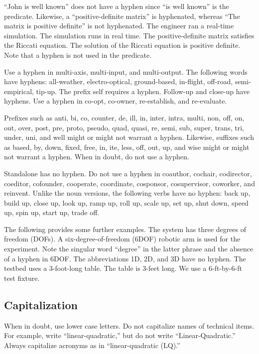 ``John is well known'' does not have a hyphen since ``is well known'' is the predicate.  Likewise, a ``positive-definite matrix'' is hyphenated, whereas ``The matrix is positive definite'' is not hyphenated.   The engineer ran a real-time simulation.  The simulation runs in real time.
%
The positive-definite matrix satisfies the Riccati equation.  The solution of the Riccati equation is positive definite.  Note that a hyphen is not used in the predicate.
%

Use a hyphen in multi-axis, multi-input, and multi-output.
The following words have hyphens:  all-weather, electro-optical, ground-based, in-flight, off-road, semi-empirical, tip-up.    
%
The prefix self requires a hyphen.
Follow-up and close-up have hyphens.
Use a hyphen in co-opt, co-owner, re-establish, and re-evaluate.


Prefixes such as anti, bi, co, counter, de, ill, in, inter, intra, multi, non, off, on, out, over, post, pre, proto, pseudo, quad, quasi, re, semi, sub, super, trans, tri, under, uni, and well might or might not warrant a hyphen.  
Likewise, suffixes such as based, by, down, fixed, free, in, ite, less, off, out, up, and wise might or might not warrant a hyphen.  When in doubt, do not use a hyphen.  

Standalone has no hyphen.  
Do not use a hyphen in coauthor, cochair, codirector, coeditor, cofounder, cooperate, coordinate, cosponsor, cosupervisor, coworker, and reinvent.  
Unlike the noun versions, the following verbs have no hyphen:  back up, build up, close up, look up, ramp up, roll up, scale up, set up, shut down, speed up, spin up, start up, trade off.  

The following provides some further examples. The system has three degrees of freedom (DOFs).  A six-degree-of-freedom (6DOF) robotic arm is used for the experiment.  Note the singular word “degree” in the latter phrase and the absence of a hyphen in 6DOF. The abbreviations 1D, 2D, and 3D have no hyphen.
%
The testbed uses a 3-foot-long table.  The table is 3-feet long.  We use a 6-ft-by-6-ft test fixture.
%

\subsection{Capitalization}
When in doubt, use lower case letters.
%
Do not capitalize names of technical items.  For example, write ``linear-quadratic,'' but do not write ``Linear-Quadratic.''  Always capitalize acronyms as in ``linear-quadratic (LQ).''


